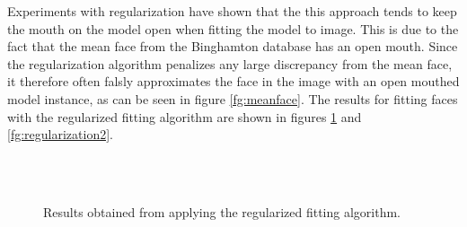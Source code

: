 \documentclass[11pt,a4paper,twoside]{report}
\begin{document}
Experiments with regularization have shown that the this approach tends to
keep the mouth on the model open when fitting the model to image. This is due to
the fact that the mean face from the Binghamton database has an open mouth. Since the regularization algorithm
penalizes any large discrepancy from the mean face, it therefore often falsly
approximates the face in the image with an open mouthed model instance, as can be seen in figure \ref{fg:meanface}. The
results for fitting faces with the regularized fitting algorithm are
shown in figures \ref{fg:regularization1} and \ref{fg:regularization2}.


\begin{figure}[H]
\centering
{}\\
\\
\caption{Results obtained from applying the regularized fitting algorithm.}\label{fg:regularization1}
\end{figure}
\end{document}
